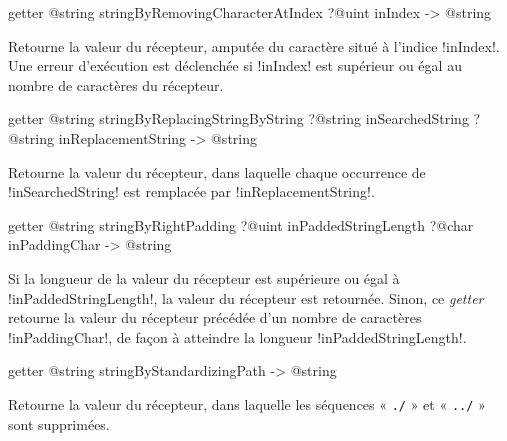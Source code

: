 
\begin{galgas3box}
getter @string stringByRemovingCharacterAtIndex ?@uint inIndex -> @string
\end{galgas3box}

Retourne la valeur du récepteur, amputée du caractère situé à l'indice \ggst!inIndex!. Une erreur d'exécution est déclenchée si \ggst!inIndex! est supérieur ou égal au nombre de caractères du récepteur.








\begin{galgas3box}
getter @string stringByReplacingStringByString
     ?@string inSearchedString
     ?@string inReplacementString  -> @string
\end{galgas3box}

Retourne la valeur du récepteur, dans laquelle chaque occurrence de \ggst!inSearchedString! est remplacée par \ggst!inReplacementString!.








\begin{galgas3box}
getter @string stringByRightPadding
   ?@uint inPaddedStringLength
   ?@char inPaddingChar -> @string
\end{galgas3box}

Si la longueur de la valeur du récepteur est supérieure ou égal à \ggst!inPaddedStringLength!, la valeur du récepteur est retournée. Sinon, ce \emph{getter} retourne la valeur du récepteur précédée d'un nombre de caractères \ggst!inPaddingChar!, de façon à atteindre la longueur \ggst!inPaddedStringLength!.





\begin{galgas3box}
getter @string stringByStandardizingPath -> @string
\end{galgas3box}

Retourne la valeur du récepteur, dans laquelle les séquences « \texttt{./} » et « \texttt{../} » sont supprimées.







